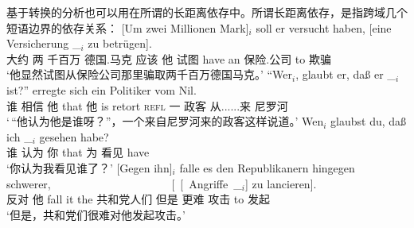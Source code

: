 基于转换的分析也可以用在所谓的长距离依存中。所谓长距离依存，是指跨域几个短语边界的依存关系：
\eal
\label{bsp-Fernabhaengigkeit}
\ex\label{bsp-um-zwei-millionen}
\gll {}[Um zwei Millionen Mark]$_i$ soll er versucht haben, [eine Versicherung \_$_i$ zu betrügen].\footnotemark\\
     {}\spacebr{}大约 两 千百万 德国.马克 应该 他 试图 have \spacebr{}an 保险.公司 {} to 欺骗\\
\glt `他显然试图从保险公司那里骗取两千百万德国马克。'
\ex
\gll "`Wer$_i$, glaubt er, daß er \_$_i$ ist?"' erregte sich ein Politiker vom Nil.\footnotemark\\
     \spacebr{}谁 相信 他 that 他 {} is retort \textsc{refl} 一 政客 从......来 尼罗河\\
\glt `\,``他认为他是谁呀？''，一个来自尼罗河来的政客这样说道。'
\ex\label{ex-wen-glaubst-du-dass}
\gll Wen$_i$ glaubst du, daß ich \_$_i$ gesehen habe?\footnotemark\\
     谁 认为 你 that 为 {} 看见 have\\
\glt `你认为我看见谁了？'
\ex 
\gll {}[Gegen ihn]$_i$ falle es den Republikanern hingegen schwerer,~~~~~~~~~~~~~~~~~~~~~ [~[~Angriffe~\_$_i$] zu lancieren].\footnotemark\\
	 {}\spacebr{}反对 他 fall it the 共和党人们 但是 更难 \hspaceThis{[~[~}攻击 to 发起\\
\glt `但是，共和党们很难对他发起攻击。'
\zl
